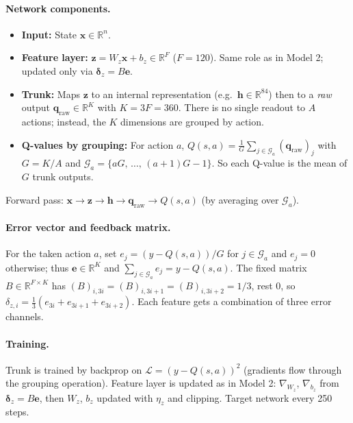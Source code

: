 \documentclass[11pt]{article}
\begin{document}
\paragraph{Network components.}
\begin{itemize}
\item \textbf{Input:} State $\mathbf{x} \in \mathbb{R}^n$.
\item \textbf{Feature layer:} $\mathbf{z} = W_z \mathbf{x} + b_z \in \mathbb{R}^F$ ($F=120$). Same role as in Model 2; updated only via $\boldsymbol{\delta}_z = B\mathbf{e}$.
\item \textbf{Trunk:} Maps $\mathbf{z}$ to an internal representation (e.g.\ $\mathbf{h} \in \mathbb{R}^{84}$) then to a \emph{raw} output $\mathbf{q}_{\mathrm{raw}} \in \mathbb{R}^K$ with $K = 3F = 360$. There is no single readout to $A$ actions; instead, the $K$ dimensions are grouped by action.
\item \textbf{Q-values by grouping:} For action $a$, $Q(s,a) = \frac{1}{G} \sum_{j \in \mathcal{G}_a} (\mathbf{q}_{\mathrm{raw}})_j$ with $G = K/A$ and $\mathcal{G}_a = \{aG,\, \ldots,\, (a+1)G - 1\}$. So each Q-value is the mean of $G$ trunk outputs.
\end{itemize}
Forward pass: $\mathbf{x} \to \mathbf{z} \to \mathbf{h} \to \mathbf{q}_{\mathrm{raw}} \to Q(s,a)$ (by averaging over $\mathcal{G}_a$).

\paragraph{Error vector and feedback matrix.} For the taken action $a$, set $e_j = (y - Q(s,a))/G$ for $j \in \mathcal{G}_a$ and $e_j = 0$ otherwise; thus $\mathbf{e} \in \mathbb{R}^K$ and $\sum_{j \in \mathcal{G}_a} e_j = y - Q(s,a)$. The fixed matrix $B \in \mathbb{R}^{F \times K}$ has $(B)_{i,3i} = (B)_{i,3i+1} = (B)_{i,3i+2} = 1/3$, rest 0, so $\delta_{z,i} = \frac{1}{3}(e_{3i} + e_{3i+1} + e_{3i+2})$. Each feature gets a combination of three error channels.

\paragraph{Training.} Trunk is trained by backprop on $\mathcal{L} = (y - Q(s,a))^2$ (gradients flow through the grouping operation). Feature layer is updated as in Model 2: $\nabla_{W_z}$, $\nabla_{b_z}$ from $\boldsymbol{\delta}_z = B\mathbf{e}$, then $W_z$, $b_z$ updated with $\eta_z$ and clipping. Target network every 250 steps.
\end{document}
